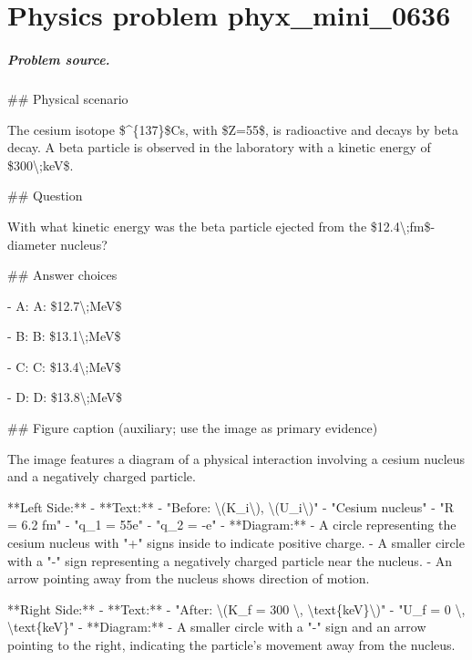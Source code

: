 
\chapter{Physics problem phyx\_mini\_0636}
\label{ch:PhyXMiniProblems_problem_phyx_mini_0636}

\paragraph{Problem source.}
\#\# Physical scenario

The cesium isotope \$\textasciicircum{}\{137\}\$Cs, with \$Z=55\$, is radioactive and decays by beta decay. A beta particle is observed in the laboratory with a kinetic energy of \$300\textbackslash{};keV\$.

\#\# Question

With what kinetic energy was the beta particle ejected from the \$12.4\textbackslash{};fm\$-diameter nucleus?

\#\# Answer choices

- A: A: \$12.7\textbackslash{};MeV\$

- B: B: \$13.1\textbackslash{};MeV\$

- C: C: \$13.4\textbackslash{};MeV\$

- D: D: \$13.8\textbackslash{};MeV\$

\#\# Figure caption (auxiliary; use the image as primary evidence)

The image features a diagram of a physical interaction involving a cesium nucleus and a negatively charged particle.

**Left Side:**
- **Text:**
  - "Before: \textbackslash{}(K\_i\textbackslash{}), \textbackslash{}(U\_i\textbackslash{})"
  - "Cesium nucleus"
  - "R = 6.2 fm"
  - "q\_1 = 55e"
  - "q\_2 = -e"
- **Diagram:**
  - A circle representing the cesium nucleus with "+" signs inside to indicate positive charge.
  - A smaller circle with a "-" sign representing a negatively charged particle near the nucleus.
  - An arrow pointing away from the nucleus shows direction of motion.

**Right Side:**
- **Text:**
  - "After: \textbackslash{}(K\_f = 300 \textbackslash{}, \textbackslash{}text\{keV\}\textbackslash{})"
  - "U\_f = 0 \textbackslash{}, \textbackslash{}text\{keV\}"
- **Diagram:**
  - A smaller circle with a "-" sign and an arrow pointing to the right, indicating the particle's movement away from the nucleus.

